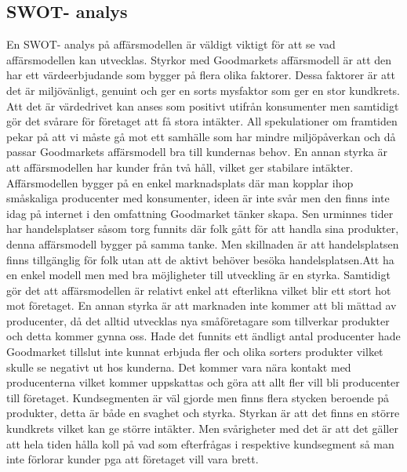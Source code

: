 \documentclass[10pt,a4paper,oneside]{article}
\begin{document}
\subsection{SWOT- analys}
En SWOT- analys på affärsmodellen är väldigt viktigt för att se vad affärsmodellen kan utvecklas. Styrkor med Goodmarkets affärsmodell är att den har ett värdeerbjudande som bygger på flera olika faktorer. Dessa faktorer är att det är miljövänligt, genuint och ger en sorts mysfaktor som ger en stor kundkrets. Att det är värdedrivet kan anses som positivt utifrån konsumenter men samtidigt gör det svårare för företaget att få stora intäkter. All spekulationer om framtiden pekar på att vi måste gå mot ett samhälle som har mindre miljöpåverkan och då passar Goodmarkets affärsmodell bra till kundernas behov. En annan styrka är att affärsmodellen har kunder från två håll, vilket ger stabilare intäkter. Affärsmodellen bygger på en enkel marknadsplats där man kopplar ihop småskaliga producenter med konsumenter, ideen är inte svår men den finns inte idag på internet i den omfattning Goodmarket tänker skapa. Sen urminnes tider har handelsplatser såsom torg funnits där folk gått för att handla sina produkter, denna affärsmodell bygger på samma tanke. Men skillnaden är att handelsplatsen finns tillgänglig för folk utan att de aktivt behöver besöka handelsplatsen.Att ha en enkel modell men med bra möjligheter till utveckling är en styrka. Samtidigt gör det att affärsmodellen är relativt enkel att efterlikna vilket blir ett stort hot mot företaget.  En annan styrka är att marknaden inte kommer att bli mättad av producenter, då det alltid utvecklas nya småföretagare som tillverkar produkter och detta kommer gynna oss. Hade det funnits ett ändligt antal producenter hade Goodmarket tillslut inte kunnat erbjuda fler och olika sorters produkter vilket skulle se negativt ut hos kunderna. Det kommer vara nära kontakt med producenterna vilket kommer uppskattas och göra att allt fler vill bli producenter till företaget. Kundsegmenten är väl gjorde men finns flera stycken beroende på produkter, detta är både en svaghet och styrka. Styrkan är att det finns en större kundkrets vilket kan ge större intäkter. Men svårigheter med det är att det gäller att hela tiden hålla koll på vad som efterfrågas i respektive kundsegment så man inte förlorar kunder pga att företaget vill vara brett. \\
\end{document}
